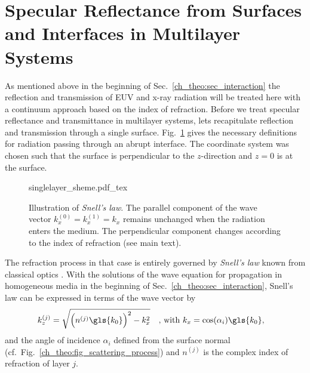 \section{Specular Reflectance from Surfaces and Interfaces in Multilayer Systems}
As mentioned above in the beginning of Sec.~\ref{ch_theo:sec_interaction} the reflection and transmission of EUV and x-ray radiation will be treated here with a continuum approach based on the index of refraction. Before we treat specular reflectance and transmittance in multilayer systems, lets recapitulate reflection and transmission through a single surface. Fig.~\ref{ch_theo:fig_singlelayer_scheme} gives the necessary definitions for radiation passing through an abrupt interface. The coordinate system was chosen such that the surface is perpendicular to the $z$-direction and $z=0$ is at the surface.
\begin{figure}[htb]
    \def\svgwidth{0.57\textwidth}
    {singlelayer_sheme.pdf_tex}
    \caption[Illustration of \emph{Snell's law}.]{Illustration of \emph{Snell's law}. The parallel component of the wave vector $k_x^{(0)} = k_x^{(1)} = k_x$ remains unchanged when the radiation enters the medium. The perpendicular component changes according to the index of refraction (see main text).}
    \label{ch_theo:fig_singlelayer_scheme}
\end{figure}
The refraction process in that case is entirely governed by \emph{Snell's law} known from classical optics \cite{born_principles_1965}. With the solutions of the wave equation for propagation in homogeneous media in the beginning of Sec.~\ref{ch_theo:sec_interaction}, Snell's law can be expressed in terms of the wave vector by
\begin{align}
k_z^{(j)} &= \sqrt{\Big(n^{(j)} \gls{k_0}\Big)^2 - k_x^2} \quad \text{, with } k_x = \cos(\alpha_i) \gls{k_0} \text{,} \label{ch_theo:eqn_snells_law}
\end{align}
and the angle of incidence $\alpha_i$ defined from the surface normal (cf.~Fig.~\ref{ch_theo:fig_scattering_process}) and $n^{(j)}$ is the complex index of refraction of layer $j$.

